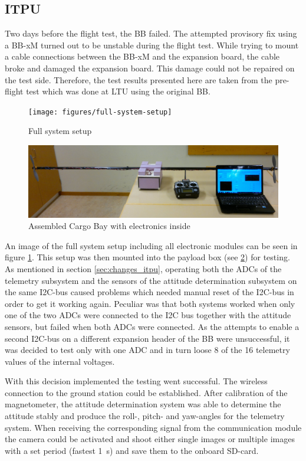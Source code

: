 \subsection{ITPU}
%
Two days before the flight test, the BB failed. The attempted provisory fix using a BB-xM turned out to be unstable during the flight test. While trying to mount a cable connections between the BB-xM and the expansion board, the cable broke and damaged the expansion board. This damage could not be repaired on the test side. Therefore, the test results presented here are taken from the pre-flight test which was done at \ac{LTU} using the original BB.

\begin{figure}
\centering
\texttt{[image: figures/full-system-setup]}
\caption{Full system setup}
\label{fig:full_system}
\end{figure}

\begin{figure}
\centering
\includegraphics[width=\textwidth]{figures/fig_CargoBay}
\caption{Assembled Cargo Bay with electronics inside}
\label{fig:cargo_bay}
\end{figure}

An image of the full system setup including all electronic modules can be seen in figure \ref{fig:full_system}. This setup was then mounted into the payload box (see \ref{fig:cargo_bay}) for testing. As mentioned in section \ref{sec:changes_itpu}, operating both the ADCs of the telemetry subsystem and the sensors of the attitude determination subsystem on the same I2C-bus caused problems which needed manual reset of the I2C-bus in order to get it working again. Peculiar was that both systems worked when only one of the two ADCs were connected to the I2C bus together with the attitude sensors, but failed when both ADCs were connected. As the attempts to enable a second I2C-bus on a different expansion header of the BB were unsuccessful, it was decided to test only with one ADC and in turn loose 8 of the 16 telemetry values of the internal voltages. 

With this decision implemented the testing went successful. The wireless connection to the ground station could be established. After calibration of the magnetometer, the attitude determination system was able to determine the attitude stably and produce the roll-, pitch- and yaw-angles for the telemetry system. When receiving the corresponding signal from the communication module the camera could be activated and shoot either single images or multiple images with a set period (fastest 1~s) and save them to the onboard SD-card.  

